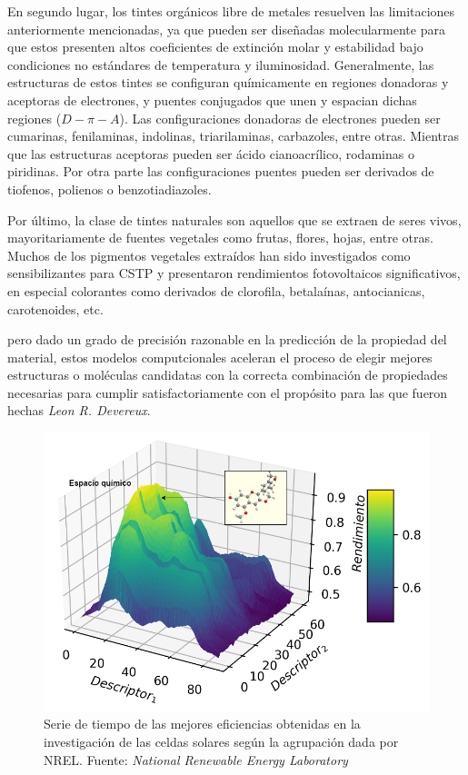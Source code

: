 En segundo lugar, los tintes orgánicos libre de metales resuelven las limitaciones anteriormente mencionadas, ya que pueden ser diseñadas molecularmente para que estos presenten altos coeficientes de extinción molar y estabilidad bajo condiciones no estándares de temperatura y iluminosidad. Generalmente, las estructuras de estos tintes se configuran químicamente en regiones donadoras y aceptoras de electrones, y puentes conjugados que unen y espacian dichas regiones ($D-\pi-A$). Las configuraciones donadoras de electrones pueden ser cumarinas, fenilaminas, indolinas, triarilaminas, carbazoles, entre otras. Mientras que las estructuras aceptoras pueden ser ácido cianoacrílico, rodaminas o piridinas. Por otra parte las configuraciones puentes pueden ser derivados de tiofenos, polienos o benzotiadiazoles. 

Por último, la clase de tintes naturales son aquellos que se extraen de seres vivos, mayoritariamente de fuentes vegetales como frutas, flores, hojas, entre otras. Muchos de los pigmentos vegetales extraídos han sido investigados como sensibilizantes para CSTP y presentaron rendimientos fotovoltaicos significativos, en especial colorantes como derivados de clorofila, betalaínas, antocianicas, carotenoides, etc. 


pero dado un grado de precisión razonable  en la predicción de la propiedad del material, estos modelos computcionales aceleran el proceso de elegir mejores estructuras o moléculas candidatas con la correcta combinación de propiedades necesarias para cumplir satisfactoriamente con el propósito para las que fueron hechas \textit{Leon R. Devereux}. 

\begin{figure}[h!]
    \begin{center}
        \includegraphics[scale=0.45]{img/espacioquimico.png}
    \end{center}
    \label{img:espacioquimico}
    \caption{Serie de tiempo de las mejores eficiencias obtenidas en la investigación de las celdas solares según la agrupación dada por NREL.
    Fuente: \textit{National Renewable Energy Laboratory} \cite{owidenergy}}
\end{figure}

